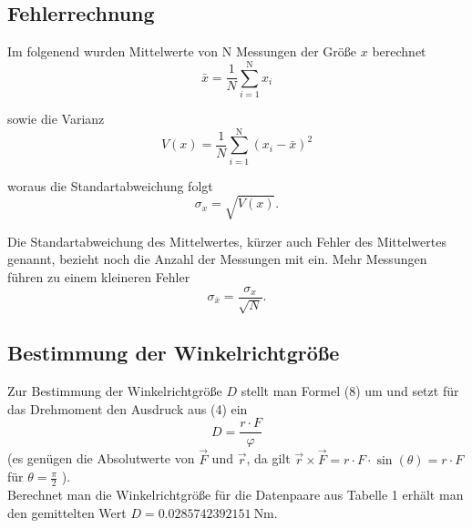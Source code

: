 \subsection{Fehlerrechnung}
Im folgenend wurden Mittelwerte von N Messungen der Größe $x$ berechnet
\begin {equation}
\bar{x} =  \frac{1}{N} \sum_{i=1}^\text{N} x_i
\end{equation}

sowie die Varianz
\begin {equation}
V(x) = \frac{1}{N} \sum_{i=1}^\text{N} (x_i - \bar{x})^2
\end{equation}

woraus die Standartabweichung folgt
\begin {equation}
\sigma_x = \sqrt{V(x)}.
\end{equation}

Die Standartabweichung des Mittelwertes, kürzer auch Fehler des Mittelwertes genannt, bezieht noch die Anzahl der Messungen mit ein. Mehr Messungen führen zu einem kleineren Fehler
\begin {equation}
\sigma_{\bar{x}} = \frac{\sigma_x}{\sqrt{N}}.
\end{equation}


\subsection{Bestimmung der Winkelrichtgröße}
Zur Bestimmung der Winkelrichtgröße $D$ stellt man Formel (8) um und setzt für das Drehmoment den Ausdruck aus (4) ein
\begin{equation}
	D = \frac{r \cdot F}{\varphi}
\end{equation}
(es genügen die Absolutwerte von $\vec{F}$ und $\vec{r}$, da gilt $ \vec{r}\times\vec{F}=r\cdot F\cdot \sin(\theta)= r\cdot F $ für $ \theta = \frac{\pi}{2} $ ). \\

Berechnet man die Winkelrichtgröße für die Datenpaare aus Tabelle 1 erhält man den gemittelten Wert $ D = 0.0285742392151\ \text{Nm}$.


